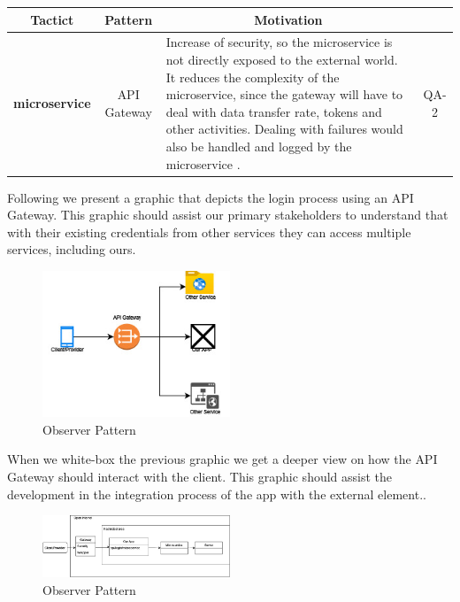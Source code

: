 \begin{table}[H]
    \begin{tabularx}{\textwidth}{|c|c|X|c|}
        \toprule
        \multicolumn{1}{c}{Tactict} & \multicolumn{1}{c}{Pattern} & \multicolumn{1}{c}{Motivation} \\
        \midrule
        \textbf{\Gls{microservice}} & \gls{API Gateway} & Increase of security, so the microservice is not directly
        exposed to the external world. It reduces the complexity of the microservice, since the gateway will have to deal
        with data transfer rate, tokens and other activities. Dealing with failures would also be handled and logged
        by the microservice \cite{refonline:javtop}. & QA-2\\
        \bottomrule
    \end{tabularx}
\end{table}

Following we present a graphic that depicts the login process using an \gls{API Gateway}. This graphic should assist
our primary stakeholders to understand that with their existing credentials from other services they can access multiple 
services, including ours.

\begin{figure}[H]
    \centering
    \includegraphics[width=0.5\textwidth]{assets/simple_api_gateway.jpg}
    \caption{Observer Pattern}
    \label{fig:simple_api_gateway}
\end{figure}

When we white-box the previous graphic we get a deeper view on how the \gls{API Gateway} should interact with the 
\gls{client}. This graphic should assist the development in the integration process of the app with the external element..

\begin{figure}[H]
    \centering
    \includegraphics[width=0.5\textwidth]{assets/complex_api_gateway.jpg}
    \caption{Observer Pattern}
    \label{fig:complex_api_gateway}
\end{figure}


